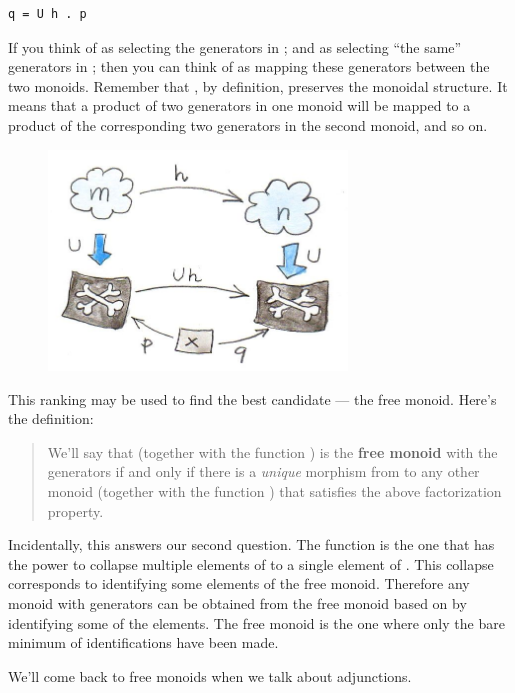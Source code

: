 \begin{Verbatim}[commandchars=\\\{\}]
q = U h . p
\end{Verbatim}
If you think of  as selecting the generators in ;
and  as selecting ``the same'' generators in ; then
you can think of  as mapping these generators between the two
monoids. Remember that , by definition, preserves the monoidal
structure. It means that a product of two generators in one monoid will
be mapped to a product of the corresponding two generators in the second
monoid, and so on.

\begin{figure}[H]
\centering
\includegraphics[width=3.12500in]{images/monoid-ranking.jpg}
\end{figure}

\noindent
This ranking may be used to find the best candidate --- the free monoid.
Here's the definition:

\begin{quote}
We'll say that  (together with the function ) is the
\textbf{free monoid} with the generators  if and only if there
is a \emph{unique} morphism  from  to any other
monoid  (together with the function ) that satisfies
the above factorization property.
\end{quote}
Incidentally, this answers our second question. The function
 is the one that has the power to collapse multiple
elements of  to a single element of . This
collapse corresponds to identifying some elements of the free monoid.
Therefore any monoid with generators  can be obtained from the
free monoid based on  by identifying some of the elements. The
free monoid is the one where only the bare minimum of identifications
have been made.

We'll come back to free monoids when we talk about adjunctions.

